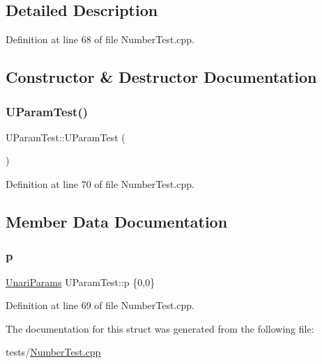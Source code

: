 \subsection{Detailed Description}


Definition at line 68 of file Number\+Test.\+cpp.



\subsection{Constructor \& Destructor Documentation}
\mbox{\label{struct_u_param_test_a4460d7e228030b3a5b6bd35cd59656be}} 
\subsubsection{\texorpdfstring{U\+Param\+Test()}{UParamTest()}}
{\footnotesize\ttfamily U\+Param\+Test\+::\+U\+Param\+Test (\begin{DoxyParamCaption}{ }\end{DoxyParamCaption})\hspace{0.3cm}{\ttfamily [inline]}}



Definition at line 70 of file Number\+Test.\+cpp.



\subsection{Member Data Documentation}
\mbox{\label{struct_u_param_test_ab8f85343a35eded9f31b05a7869608c9}} 
\subsubsection{\texorpdfstring{p}{p}}
{\footnotesize\ttfamily \hyperlink{struct_unari_params}{Unari\+Params} U\+Param\+Test\+::p \{0,0\}}



Definition at line 69 of file Number\+Test.\+cpp.



The documentation for this struct was generated from the following file\+:\begin{DoxyCompactItemize}
\item 
tests/\hyperlink{_number_test_8cpp}{Number\+Test.\+cpp}\end{DoxyCompactItemize}
